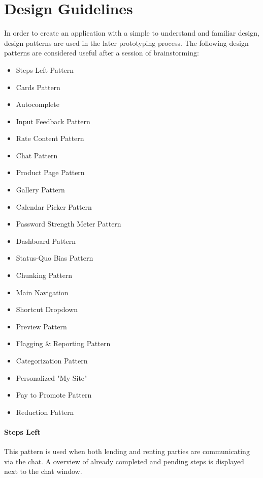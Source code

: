 \section{Design Guidelines}
	In order to create an application with a simple to understand and familiar design, design patterns are used in the later prototyping process. The following design patterns are considered useful after a session of brainstorming:
	
	\begin{itemize}
		\item Steps Left Pattern
		\item Cards Pattern
		\item Autocomplete	
		\item Input Feedback Pattern
		\item Rate Content Pattern
		\item Chat Pattern
		\item Product Page Pattern
		\item Gallery Pattern
		\item Calendar Picker Pattern
		\item Password Strength Meter Pattern
		\item Dashboard Pattern
		\item Status-Quo Bias Pattern
		\item Chunking Pattern
		\item Main Navigation
		\item Shortcut Dropdown
		
		\item Preview Pattern
		\item Flagging \& Reporting Pattern
		\item Categorization Pattern
		\item Personalized "My Site"
		\item Pay to Promote Pattern
		\item Reduction Pattern
	\end{itemize}

	\paragraph{Steps Left}
		This pattern is used when both lending and renting parties are communicating via the chat. A overview of already completed and pending steps is displayed next to the chat window.
		
